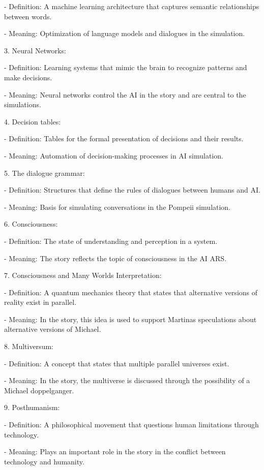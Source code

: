 \documentclass[
]{article}
\begin{document}
- Definition: A machine learning architecture that captures semantic
relationships between words.

- Meaning: Optimization of language models and dialogues in the
simulation.

3. Neural Networks:

- Definition: Learning systems that mimic the brain to recognize
patterns and make decisions.

- Meaning: Neural networks control the AI \hspace{0pt}\hspace{0pt}in the
story and are central to the simulations.

4. Decision tables:

- Definition: Tables for the formal presentation of decisions and their
results.

- Meaning: Automation of decision-making processes in AI simulation.

5. The dialogue grammar:

- Definition: Structures that define the rules of dialogues between
humans and AI.

- Meaning: Basis for simulating conversations in the Pompeii simulation.

6. Consciousness:

- Definition: The state of understanding and perception in a system.

- Meaning: The story reflects the topic of consciousness in the AI
\hspace{0pt}\hspace{0pt}ARS.

7. Consciousness and Many Worlds Interpretation:

- Definition: A quantum mechanics theory that states that alternative
versions of reality exist in parallel.

- Meaning: In the story, this idea is used to support
Martina\textquotesingle s speculations about alternative versions of
Michael.

8. Multiversum:

- Definition: A concept that states that multiple parallel universes
exist.

- Meaning: In the story, the multiverse is discussed through the
possibility of a Michael doppelganger.

9. Posthumanism:

- Definition: A philosophical movement that questions human limitations
through technology.

- Meaning: Plays an important role in the story in the conflict between
technology and humanity.
\end{document}
